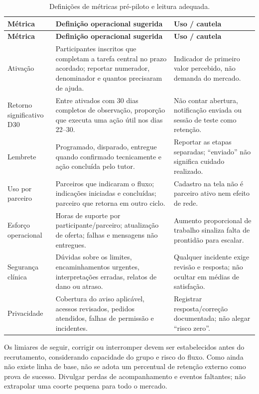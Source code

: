 \documentclass[12pt,a4paper]{article}
\begin{document}
\begin{longtable}{p{3.0cm}p{5.5cm}p{4.8cm}}
\caption{Definições de métricas pré-piloto e leitura adequada.}\\
\toprule
\textbf{Métrica} & \textbf{Definição operacional sugerida} & \textbf{Uso / cautela}\\
\midrule
\endfirsthead
\toprule\textbf{Métrica} & \textbf{Definição operacional sugerida} & \textbf{Uso / cautela}\\\midrule
\endhead
Ativação & Participantes inscritos que completam a tarefa central no prazo acordado; reportar numerador, denominador e quantos precisaram de ajuda. & Indicador de primeiro valor percebido, não demanda do mercado.\\
Retorno significativo D30 & Entre ativados com 30 dias completos de observação, proporção que executa uma ação útil nos dias 22--30. & Não contar abertura, notificação enviada ou sessão de teste como retenção.\\
Lembrete & Programado, disparado, entregue quando confirmado tecnicamente e ação concluída pelo tutor. & Reportar as etapas separadas; “enviado” não significa cuidado realizado.\\
Uso por parceiro & Parceiros que indicaram o fluxo; indicações iniciadas e concluídas; parceiro que retorna em outro ciclo. & Cadastro na tela não é parceiro ativo nem efeito de rede.\\
Esforço operacional & Horas de suporte por participante/parceiro; atualização de oferta; falhas e mensagens não entregues. & Aumento proporcional de trabalho sinaliza falta de prontidão para escalar.\\
Segurança clínica & Dúvidas sobre os limites, encaminhamentos urgentes, interpretações erradas, relatos de dano ou atraso. & Qualquer incidente exige revisão e resposta; não ocultar em médias de satisfação.\\
Privacidade & Cobertura do aviso aplicável, acessos revisados, pedidos atendidos, falhas de permissão e incidentes. & Registrar resposta/correção documentada; não alegar “risco zero”.\\
\bottomrule
\end{longtable}

Os limiares de seguir, corrigir ou interromper devem ser estabelecidos antes do recrutamento, considerando capacidade do grupo e risco do fluxo. Como ainda não existe linha de base, não se adota um percentual de retenção externo como prova de sucesso. Divulgar perdas de acompanhamento e eventos faltantes; não extrapolar uma coorte pequena para todo o mercado.
\end{document}
